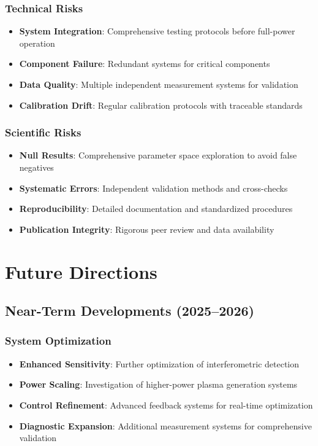 \documentclass[10pt,twocolumn]{article}
\begin{document}
\subsubsection{Technical Risks}
\begin{itemize}
\item \textbf{System Integration}: Comprehensive testing protocols before full-power operation
\item \textbf{Component Failure}: Redundant systems for critical components
\item \textbf{Data Quality}: Multiple independent measurement systems for validation
\item \textbf{Calibration Drift}: Regular calibration protocols with traceable standards
\end{itemize}

\subsubsection{Scientific Risks}
\begin{itemize}
\item \textbf{Null Results}: Comprehensive parameter space exploration to avoid false negatives
\item \textbf{Systematic Errors}: Independent validation methods and cross-checks
\item \textbf{Reproducibility}: Detailed documentation and standardized procedures
\item \textbf{Publication Integrity}: Rigorous peer review and data availability
\end{itemize}

\section{Future Directions}

\subsection{Near-Term Developments (2025--2026)}

\subsubsection{System Optimization}
\begin{itemize}
\item \textbf{Enhanced Sensitivity}: Further optimization of interferometric detection
\item \textbf{Power Scaling}: Investigation of higher-power plasma generation systems
\item \textbf{Control Refinement}: Advanced feedback systems for real-time optimization
\item \textbf{Diagnostic Expansion}: Additional measurement systems for comprehensive validation
\end{itemize}
\end{document}
